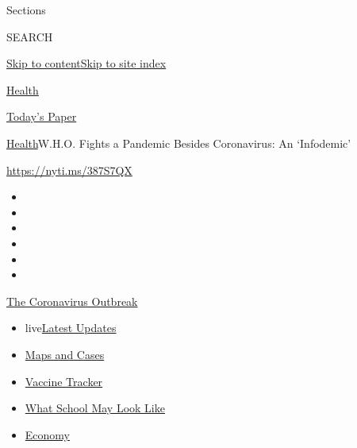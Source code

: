 Sections

SEARCH

\protect\hyperlink{site-content}{Skip to
content}\protect\hyperlink{site-index}{Skip to site index}

\href{https://www.nytimes.com/section/health}{Health}

\href{https://myaccount.nytimes.com/auth/login?response_type=cookie\&client_id=vi}{}

\href{https://www.nytimes.com/section/todayspaper}{Today's Paper}

\href{/section/health}{Health}\textbar{}W.H.O. Fights a Pandemic Besides
Coronavirus: An `Infodemic'

\url{https://nyti.ms/387S7QX}

\begin{itemize}
\item
\item
\item
\item
\item
\item
\end{itemize}

\href{https://www.nytimes.com/news-event/coronavirus?action=click\&pgtype=Article\&state=default\&region=TOP_BANNER\&context=storylines_menu}{The
Coronavirus Outbreak}

\begin{itemize}
\tightlist
\item
  live\href{https://www.nytimes.com/2020/08/01/world/coronavirus-covid-19.html?action=click\&pgtype=Article\&state=default\&region=TOP_BANNER\&context=storylines_menu}{Latest
  Updates}
\item
  \href{https://www.nytimes.com/interactive/2020/us/coronavirus-us-cases.html?action=click\&pgtype=Article\&state=default\&region=TOP_BANNER\&context=storylines_menu}{Maps
  and Cases}
\item
  \href{https://www.nytimes.com/interactive/2020/science/coronavirus-vaccine-tracker.html?action=click\&pgtype=Article\&state=default\&region=TOP_BANNER\&context=storylines_menu}{Vaccine
  Tracker}
\item
  \href{https://www.nytimes.com/interactive/2020/07/29/us/schools-reopening-coronavirus.html?action=click\&pgtype=Article\&state=default\&region=TOP_BANNER\&context=storylines_menu}{What
  School May Look Like}
\item
  \href{https://www.nytimes.com/live/2020/07/31/business/stock-market-today-coronavirus?action=click\&pgtype=Article\&state=default\&region=TOP_BANNER\&context=storylines_menu}{Economy}
\end{itemize}

